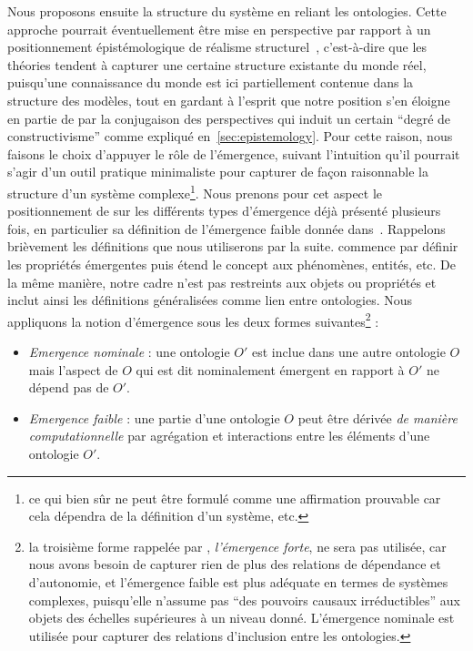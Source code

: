 {Nous proposons ensuite la structure du système en reliant les ontologies. Cette approche pourrait éventuellement être mise en perspective par rapport à un positionnement épistémologique de réalisme structurel~\cite{frigg2011everything}, c'est-à-dire que les théories tendent à capturer une certaine structure existante du monde réel, puisqu'une connaissance du monde est ici partiellement contenue dans la structure des modèles, tout en gardant à l'esprit que notre position s'en éloigne en partie de par la conjugaison des perspectives qui induit un certain ``degré de constructivisme'' comme expliqué en~\ref{sec:epistemology}. Pour cette raison, nous faisons le choix d'appuyer le rôle de l'émergence, suivant l'intuition qu'il pourrait s'agir d'un outil pratique minimaliste pour capturer de façon raisonnable la structure d'un système complexe\footnote{ce qui bien sûr ne peut être formulé comme une affirmation prouvable car cela dépendra de la définition d'un système, etc.}. Nous prenons pour cet aspect le positionnement de  sur les différents types d'émergence déjà présenté plusieurs fois, en particulier sa définition de l'émergence faible donnée dans~\cite{bedau2002downward}. Rappelons brièvement les définitions que nous utiliserons par la suite.  commence par définir les propriétés émergentes puis étend le concept aux phénomènes, entités, etc. De la même manière, notre cadre n'est pas restreints aux objets ou propriétés et inclut ainsi les définitions généralisées comme lien entre ontologies. Nous appliquons la notion d'émergence sous les deux formes suivantes\footnote{la troisième forme rappelée par , \emph{l'émergence forte}, ne sera pas utilisée, car nous avons besoin de capturer rien de plus des relations de dépendance et d'autonomie, et l'émergence faible est plus adéquate en termes de systèmes complexes, puisqu'elle n'assume pas ``des pouvoirs causaux irréductibles'' aux objets des échelles supérieures à un niveau donné. L'émergence nominale est utilisée pour capturer des relations d'inclusion entre les ontologies.} :
\begin{itemize}
\item \emph{Emergence nominale} : une ontologie $O'$ est inclue dans une autre ontologie $O$ mais l'aspect de $O$ qui est dit nominalement émergent en rapport à $O'$ ne dépend pas de $O'$.
\item \emph{Emergence faible} : une partie d'une ontologie $O$ peut être dérivée \emph{de manière computationnelle} par agrégation et interactions entre les éléments d'une ontologie $O'$.
\end{itemize}
}



